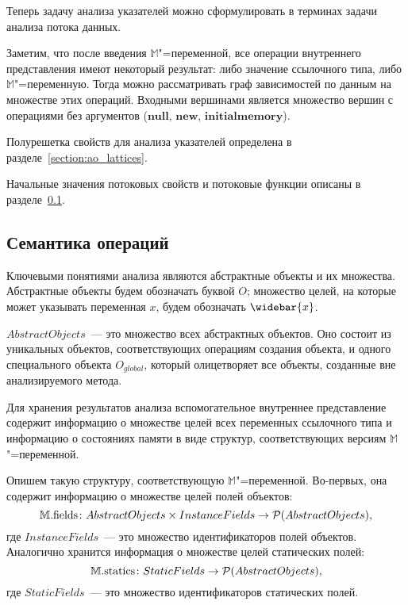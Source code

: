 \documentclass[14pt,titlepage,draft]{extarticle}
\newcommand{\M}{\ensuremath{\mathbb{M}}}
\newcommand{\Mfield}[1]{\ensuremath{\mathrm{#1}}}
\newcommand{\op}[1]{\mathbf{#1}}
\newcommand{\pts}[1]{\widebar{#1}}
\newcommand{\AO}[1]{O_{#1}}
\newcommand{\AOGlobal}{\AO{global}}
\begin{document}
    Теперь задачу анализа указателей можно сформулировать в терминах задачи
    анализа потока данных.

    Заметим, что после введения \M"=переменной, все операции внутреннего
    представления имеют некоторый результат: либо значение ссылочного типа,
    либо \M"=переменную. Тогда можно рассматривать граф зависимостей по данным
    на множестве этих операций. Входными вершинами является множество вершин с
    операциями без аргументов
    ($\op{null}$, $\op{new}$, $\op{initialmemory}$).

    Полурешетка свойств для анализа указателей определена в
    разделе~\ref{section:ao_lattices}.

    Начальные значения потоковых свойств и потоковые функции описаны
    в разделе~\ref{section:flow_functions}.

  \subsection{Семантика операций}
    \label{section:flow_functions}


    Ключевыми понятиями анализа являются абстрактные объекты и их множества.
    Абстрактные объекты будем обозначать буквой $O$; множество целей, на
    которые может указывать переменная $x$, будем обозначать $\pts{x}$.

    $AbstractObjects$~--- это множество всех абстрактных объектов. Оно
    состоит из уникальных объектов, соответствующих операциям создания
    объекта, и одного специального объекта $\AOGlobal$, который олицетворяет
    все объекты, созданные вне анализируемого метода.

    Для хранения результатов анализа вспомогательное внутреннее представление
    содержит информацию о множестве целей всех переменных ссылочного
    типа и информацию о состояниях памяти в виде структур, соответствующих
    версиям \M"=переменной.

    Опишем такую структуру, соответствующую \M"=переменной. Во-первых, она
    содержит информацию о множестве целей полей объектов:
    \[ \M.\Mfield{fields}\colon
      AbstractObjects \times InstanceFields \to
      \powerset{AbstractObjects},
    \]
    где $InstanceFields$~--- это множество идентификаторов полей
    объектов. Аналогично хранится информация о множестве целей статических
    полей:
    \[ \M.\Mfield{statics}\colon
      StaticFields \to \powerset{AbstractObjects},
    \]
    где $StaticFields$~--- это множество идентификаторов
    статических полей.
\end{document}
